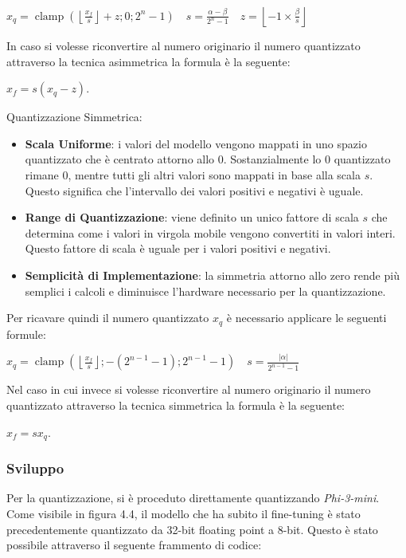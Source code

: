     \centerline{$x_q=\operatorname{clamp}\left(\left\lfloor\frac{x_f}{s}\right\rfloor+z ; 0 ; 2^n-1\right) \quad s=\frac{\alpha-\beta}{2^n-1} \quad z=\left\lfloor-1 \times \frac{\beta}{s}\right\rfloor$}
    
    In caso si volesse riconvertire al numero originario il numero quantizzato attraverso la tecnica asimmetrica la formula è la seguente:\\
    \centerline{$x_f = s(x_q-z)$.}
    Quantizzazione Simmetrica:
    \begin{itemize}
        \item \textbf{Scala Uniforme}: i valori del modello vengono mappati in uno spazio quantizzato che è centrato attorno allo 0. Sostanzialmente lo 0 quantizzato rimane 0, mentre tutti gli altri valori sono mappati in base alla scala $s$. Questo significa che l'intervallo dei valori positivi e negativi è uguale.
        \item \textbf{Range di Quantizzazione}: viene definito un unico fattore di scala $s$ che determina come i valori in virgola mobile vengono convertiti in valori interi. Questo fattore di scala è uguale per i valori positivi e negativi.
        \item  \textbf{Semplicità di Implementazione}: la simmetria attorno allo zero rende più semplici i calcoli e diminuisce l'hardware necessario per la quantizzazione.
    \end{itemize}
    Per ricavare quindi il numero quantizzato $x_q$ è necessario applicare le seguenti formule:
    \centerline{$x_q=\operatorname{clamp}\left(\left\lfloor\frac{x_f}{s}\right\rfloor ;-\left(2^{n-1}-1\right) ; 2^{n-1}-1\right) \quad s=\frac{|\alpha|}{2^{n-1}-1}$}
    Nel caso in cui invece si volesse riconvertire al numero originario il numero quantizzato attraverso la tecnica simmetrica la formula è la seguente:\\
    \centerline{$x_f = sx_q$.}


    \subsubsection{Sviluppo}
    Per la quantizzazione, si è proceduto direttamente quantizzando \textit{Phi-3-mini}. Come visibile in figura 4.4, il modello che ha subito il fine-tuning è stato precedentemente quantizzato da 32-bit floating point a 8-bit. Questo è stato possibile attraverso il seguente frammento di codice:
    
